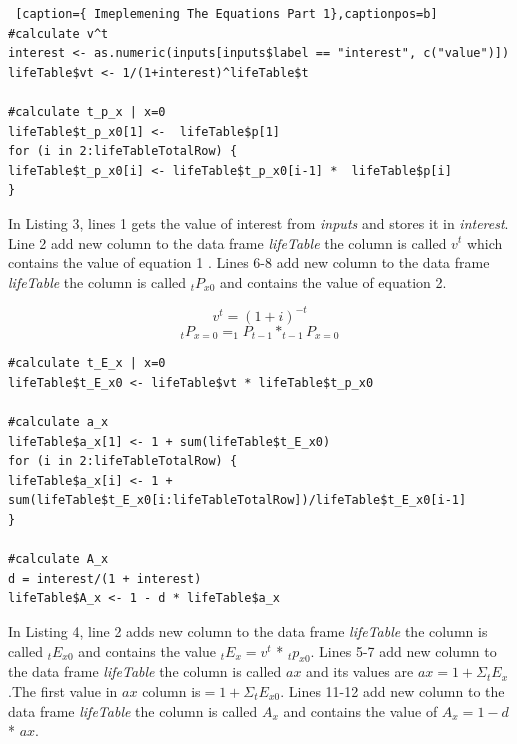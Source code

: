 \documentclass[12pt]{article}
\def\StartLineAtOne{\lstset{firstnumber=1}}
\begin{document}
\pagebreak
\StartLineAtOne
\begin{lstlisting} [caption={ Imeplemening The Equations Part 1},captionpos=b]
#calculate v^t
interest <- as.numeric(inputs[inputs$label == "interest", c("value")])
lifeTable$vt <- 1/(1+interest)^lifeTable$t

#calculate t_p_x | x=0
lifeTable$t_p_x0[1] <-  lifeTable$p[1]
for (i in 2:lifeTableTotalRow) {
lifeTable$t_p_x0[i] <- lifeTable$t_p_x0[i-1] *  lifeTable$p[i]
}
\end{lstlisting}
In Listing 3, lines 1 gets the value of interest from \textit{inputs} and stores it in \textit{interest}. Line 2 add new column to the data frame \textit{lifeTable} the column is called $v^{t}$ which contains the value of equation 1 . Lines 6-8 add new column to the data frame \textit{lifeTable} the column is called $_{t}P_{x0}$ and contains the value of equation 2.

\begin{equation}
v^t=(1+i)^{-t}
\end{equation}
\begin{equation}
 _{t}P_{x=0}=_{1}P_{t-1} * _{t-1}P_{x=0}
\end{equation}

\StartLineAtOne
\begin{lstlisting}[caption={Imeplemening The Equations Part 2},captionpos=b]
#calculate t_E_x | x=0
lifeTable$t_E_x0 <- lifeTable$vt * lifeTable$t_p_x0

#calculate a_x
lifeTable$a_x[1] <- 1 + sum(lifeTable$t_E_x0)
for (i in 2:lifeTableTotalRow) {
lifeTable$a_x[i] <- 1 + sum(lifeTable$t_E_x0[i:lifeTableTotalRow])/lifeTable$t_E_x0[i-1]
}

#calculate A_x
d = interest/(1 + interest)
lifeTable$A_x <- 1 - d * lifeTable$a_x
\end{lstlisting}
In Listing 4, line 2 adds new column to the data frame \textit{lifeTable} the column is called $_{t}E_{x0}$ and contains the value $_{t}E_{x}=v^t$ *  $_{t}p_{x0}$. Lines 5-7 add new column to the data frame \textit{lifeTable} the column is called $ax$ and its values are $ax=1+\Sigma _{t}E_{x}$.The first value in  $ax$ column is$=1+\Sigma _{t}E_{x0}$. Lines 11-12 add new column to the data frame \textit{lifeTable} the column is called $A_{x}$ and contains the value of $A_{x}=1-d$ * $ax$.
\end{document}
